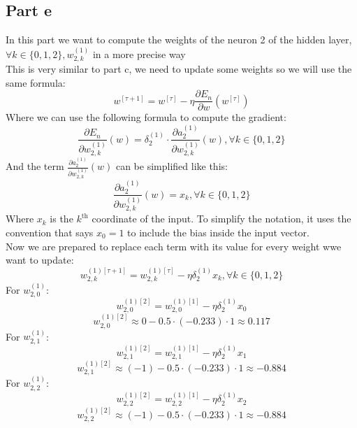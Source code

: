 \documentclass[a4paper, 10pt]{article}
\begin{document}
\subsection{Part e}
In this part we want to compute the weights of the neuron 2 of the hidden layer, $\forall k \in \{0,1,2\}, w_{2,k}^{(1)}$ in a more precise way 
\\
This is very similar to part c, we need to update some weights so we will use the same formula:
$$
w^{[\tau +1]} = w^{[\tau]} - \eta \frac{\partial E_n}{\partial w}(w^{[\tau]})
$$
Where we can use the following formula to compute the gradient:
$$
\frac{\partial E_n}{\partial w_{2,k}^{(1)}}(w) = \delta_2^{(1)} \cdot \frac{\partial a_2^{(1)}}{\partial w_{2,k}^{(1)}}(w),  \forall k\in\{0,1,2\} 
$$
And the term $\frac{\partial a_2^{(1)}}{\partial w_{2,k}^{(1)}}(w)$ can be simplified like this:
$$
\frac{\partial a_2^{(1)}}{\partial w_{2,k}^{(1)}}(w) = x_k, \forall k \in\{0,1,2\}
$$
Where $x_k$ is the $k^\text{th}$ coordinate of the input. To simplify the notation, it uses the convention that says $x_0=1$ to
include the bias inside the input vector.
\\
Now we are prepared to replace each term with its value for every weight wwe want to update:
$$
w_{2,k}^{(1)[\tau +1]} = w_{2,k}^{(1)[\tau]} - \eta \delta_2^{(1)}x_k, \forall k \in \{0,1,2\}
$$
For $w_{2,0}^{(1)}$:
$$
w_{2,0}^{(1)[2]} = w_{2,0}^{(1)[1]} - \eta \delta_2^{(1)}x_0
$$
$$
w_{2,0}^{(1)[2]} \approx 0 - 0.5\cdot(-0.233)\cdot1 \approx 0.117
$$
For $w_{2,1}^{(1)}$:
$$
w_{2,1}^{(1)[2]} = w_{2,1}^{(1)[1]} - \eta \delta_2^{(1)}x_1
$$
$$
w_{2,1}^{(1)[2]} \approx (-1) - 0.5\cdot(-0.233)\cdot1 \approx -0.884
$$
For $w_{2,2}^{(1)}$:
$$
w_{2,2}^{(1)[2]} = w_{2,2}^{(1)[1]} - \eta \delta_2^{(1)}x_2
$$
$$
w_{2,2}^{(1)[2]} \approx (-1) - 0.5\cdot(-0.233)\cdot1 \approx -0.884
$$
\end{document}
